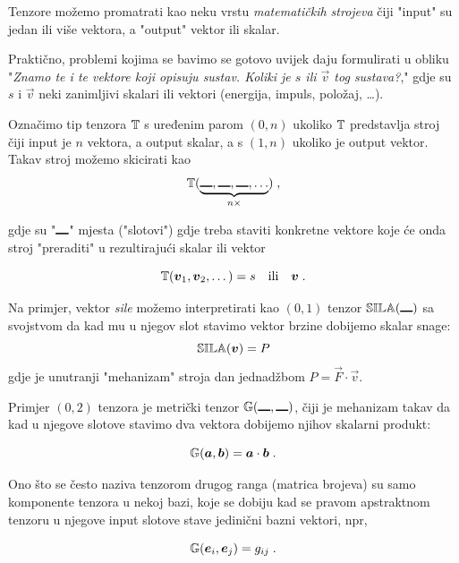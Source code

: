 Tenzore možemo promatrati kao neku vrstu \emph{matematičkih strojeva}
\cite{MTW:2017}
čiji "input" su jedan ili više vektora, a "output" vektor ili
skalar. 

Praktično, problemi kojima se bavimo se gotovo uvijek daju formulirati
u obliku "\emph{Znamo te i te vektore koji opisuju sustav. Koliki
je $s$ ili $\vec{v}$ tog sustava?}," gdje su $s$ i $\vec{v}$ neki
zanimljivi skalari ili vektori (energija, impuls, položaj, \dots).

Označimo tip tenzora $\mathbb{T}$ s uređenim parom $(0, n)$ ukoliko 
$\mathbb{T}$ predstavlja stroj čiji input je $n$ vektora, a output skalar,
a s $(1, n)$ ukoliko je output vektor. Takav stroj
možemo skicirati kao
\begin{equation}
   \bbtensor{T}(\underbrace{\slot, \slot, \slot, \dots}_{n \times})  \;,
\end{equation}

gdje su "$\rule{1em}{1pt}$" mjesta ("slotovi") gdje treba staviti konkretne vektore
koje će onda stroj "preraditi" u rezultirajući skalar ili vektor

\begin{equation}
   \bbtensor{T}(\vec{v}_1, \vec{v}_2, \dots) = s \quad \text{ili} \quad \vec{v} \;.
\end{equation}

Na primjer, vektor \emph{sile} možemo interpretirati kao
$(0, 1)$ tenzor $\bbtensor{SILA}(\slot)$ sa svojstvom da kad mu
u njegov slot stavimo vektor brzine dobijemo skalar snage:
\begin{equation}
   \bbtensor{SILA}(\vec{v}) = P
\end{equation}
gdje je unutranji "mehanizam" stroja dan jednadžbom $P = \vec{F}\cdot\vec{v}$.

Primjer $(0,2)$ tenzora je metrički tenzor $\bbtensor{G}(\slot, \slot)$,
čiji je mehanizam takav da kad u njegove slotove stavimo dva vektora
dobijemo njihov skalarni produkt:

\begin{equation}
   \bbtensor{G}(\vec{a}, \vec{b}) = \vec{a}\cdot\vec{b} \;.
\end{equation}

Ono što se često naziva tenzorom drugog ranga (matrica brojeva) su
samo komponente tenzora u nekoj bazi, koje se
dobiju kad se pravom apstraktnom tenzoru u njegove input slotove
stave jedinični bazni vektori, npr,

\begin{equation}
   \bbtensor{G}(\vec{e}_i, \vec{e}_j) = g_{ij} \;.
\label{eq:Gkomponente}
\end{equation}

